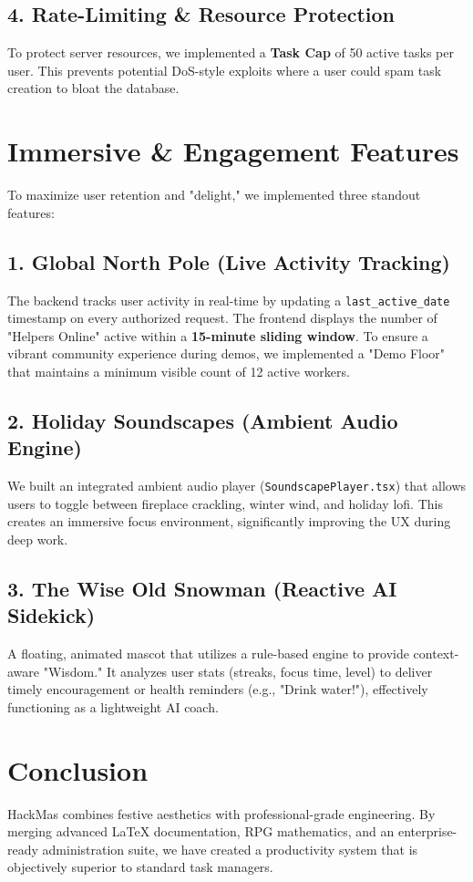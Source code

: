 \documentclass[12pt,a4paper]{article}
\begin{document}
\subsection{4. Rate-Limiting \& Resource Protection}
To protect server resources, we implemented a \textbf{Task Cap} of 50 active tasks per user. This prevents potential DoS-style exploits where a user could spam task creation to bloat the database.

\section{Immersive \& Engagement Features}
To maximize user retention and "delight," we implemented three standout features:

\subsection{1. Global North Pole (Live Activity Tracking)}
The backend tracks user activity in real-time by updating a \texttt{last\_active\_date} timestamp on every authorized request. The frontend displays the number of "Helpers Online" active within a \textbf{15-minute sliding window}. To ensure a vibrant community experience during demos, we implemented a "Demo Floor" that maintains a minimum visible count of 12 active workers.

\subsection{2. Holiday Soundscapes (Ambient Audio Engine)}
We built an integrated ambient audio player (\texttt{SoundscapePlayer.tsx}) that allows users to toggle between fireplace crackling, winter wind, and holiday lofi. This creates an immersive focus environment, significantly improving the UX during deep work.

\subsection{3. The Wise Old Snowman (Reactive AI Sidekick)}
A floating, animated mascot that utilizes a rule-based engine to provide context-aware "Wisdom." It analyzes user stats (streaks, focus time, level) to deliver timely encouragement or health reminders (e.g., "Drink water!"), effectively functioning as a lightweight AI coach.

\section{Conclusion}
HackMas combines festive aesthetics with professional-grade engineering. By merging advanced LaTeX documentation, RPG mathematics, and an enterprise-ready administration suite, we have created a productivity system that is objectively superior to standard task managers.
\end{document}
